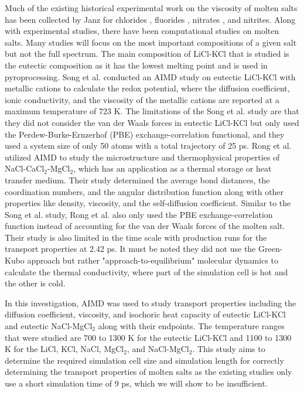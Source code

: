 \documentclass[review]{elsarticle}
\begin{document}
Much of the existing historical experimental work on the viscosity of molten salts has been collected by Janz for chlorides \cite{janz_visc}, fluorides \cite{janz1974molten}, nitrates \cite{janz1972molten}, and nitrites\cite{janz1972molten}. Along with experimental studies, there have been computational studies on molten salts. Many studies will focus on the most important compositions of a given salt but not the full spectrum. The main composition of LiCl-KCl that is studied is the eutectic composition as it has the lowest melting point and is used in pyroprocessing. Song et al. \cite{SONG2017462} conducted an AIMD study on eutectic LiCl-KCl with metallic cations to calculate the redox potential, where the diffusion coefficient, ionic conductivity, and the viscosity of the metallic cations are reported at a maximum temperature of 723 K. The limitations of the Song et al. study are that they did not consider the van der Waals forces in eutectic LiCl-KCl but only used the Perdew-Burke-Ernzerhof (PBE) \cite{PBE1996} exchange-correlation functional, and they used a system size of only 50 atoms with a total trajectory of 25 ps. Rong et al. \cite{RONG2020110696} utilized AIMD to study the microstructure and thermophysical properties of NaCl-CaCl$_2$-MgCl$_2$, which has an application as a thermal storage or heat transfer medium. Their study determined the average bond distances, the coordination numbers, and the angular distribution function along with other properties like density, viscosity, and the self-diffusion coefficient. Similar to the Song et al. study, Rong et al. also only used the PBE exchange-correlation function instead of accounting for the van der Waals forces of the molten salt. Their study is also limited in the time scale with production runs for the transport properties at 2.42 ps. It must be noted they did not use the Green-Kubo approach but rather "approach-to-equilibrium" molecular dynamics to calculate the thermal conductivity, where part of the simulation cell is hot and the other is cold.

In this investigation, AIMD was used to study transport properties including the diffusion coefficient, viscosity, and isochoric heat capacity of eutectic LiCl-KCl and eutectic NaCl-MgCl$_2$ along with their endpoints. The temperature ranges that were studied are 700 to 1300 K for the eutectic LiCl-KCl and 1100 to 1300 K for the LiCl, KCl, NaCl, MgCl$_2$, and NaCl-MgCl$_2$. This study aims to determine the required simulation cell size and simulation length for correctly determining the transport properties of molten salts as the existing studies \cite{Bengston2014} only use a short simulation time of 9 ps, which we will show to be insufficient.
\end{document}
